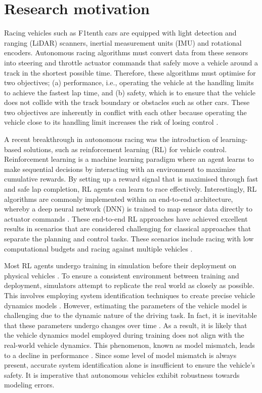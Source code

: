 \section{Research motivation}

Racing vehicles such as F1tenth cars are equipped with light detection and ranging (LiDAR) scanners, inertial measurement units (IMU) and rotational encoders.
Autonomous racing algorithms must convert data from these sensors into steering and throttle actuator commands  that safely move a vehicle around a track in the shortest possible time.
Therefore, these algorithms must optimise for two objectives;
(a) performance, i.e., operating the vehicle at the handling limits to achieve the fastest lap time, and (b) safety, which is to ensure that the vehicle does not collide with the track boundary or obstacles such as other cars.
These two objectives are inherently in conflict with each other because operating the vehicle close to its handling limit increases the risk of losing control \cite{Betz2021}.

A recent breakthrough in autonomous racing was the introduction of learning-based solutions, such as reinforcement learning (RL) for vehicle control.
Reinforcement learning is a machine learning paradigm where an agent learns to make sequential decisions by interacting with an environment to maximize cumulative rewards.
By setting up a reward signal that is maximised through fast and safe lap completion, RL agents can learn to race effectively.
Interestingly, RL algorithms are commonly implemented within an end-to-end architecture, whereby a deep neural network (DNN) is trained to map sensor data directly to actuator commands \cite{Betz2021}.
These end-to-end RL approaches have achieved excellent results in scenarios that are considered challenging for classical approaches that separate the planning and control tasks.
These scenarios include racing with low computational budgets \cite{Evans2021a, Tatulea-Codrean2020} and racing against multiple vehicles \cite{Song2021, Wurman2022}.

Most RL agents undergo training in simulation before their deployment on physical vehicles \cite{Babu2020, Zhou2020}.
To ensure a consistent environment between training and deployment, simulators attempt to replicate the real world as closely as possible.
This involves employing system identification techniques to create precise vehicle dynamics models \cite{Zhou2020}.
However, estimating the parameters of the vehicle model is challenging due to the dynamic nature of the driving task. 
In fact, it is inevitable that these parameters undergo changes over time \cite{Zhao2017}.
As a result, it is likely that the vehicle dynamics model employed during training does not align with the real-world vehicle dynamics. 
This phenomenon, known as model mismatch, leads to a decline in performance \cite{Ghignone2022}. 
Since some level of model mismatch is always present, accurate system identification alone is insufficient to ensure the vehicle's safety. 
It is imperative that autonomous vehicles exhibit robustness towards modeling errors.

